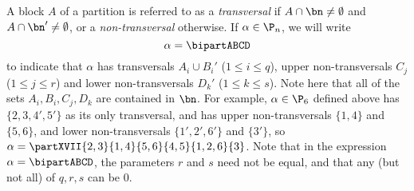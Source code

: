 
A block $A$ of a partition is referred to as a \emph{transversal} if
$A\cap\bn\not=\emptyset$ and $A\cap\bn'\not=\emptyset$, or a
\emph{non-transversal} otherwise.  
%
If $\alpha\in\P_n$, we will write
\[
\alpha=\bipartABCD
\]
to indicate that $\alpha$ has transversals $A_i\cup B_i'$ ($1\leq i\leq q$), upper non-transversals $C_j$ ($1\leq j\leq r$) and lower non-transversals $D_k'$ ($1\leq k\leq s$).  Note here that all of the sets $A_i,B_i,C_j,D_k$ are contained in $\bn$.
%
For example, $\alpha\in\P_6$ defined above has $\{2,3,4',5'\}$ as its only
transversal, and has upper non-transversals $\{1,4\}$ and
$\{5,6\}$, and lower non-transversals $\{1',2',6'\}$ and $\{3'\}$,
so $\alpha = \partXVII{2,3}{1,4}{5,6}{4,5}{1,2,6}{3}$.
Note that in the expression $\alpha=\bipartABCD$, the parameters $r$ and $s$ need
not be equal, and that any (but not all) of $q,r,s$ can be $0$.



